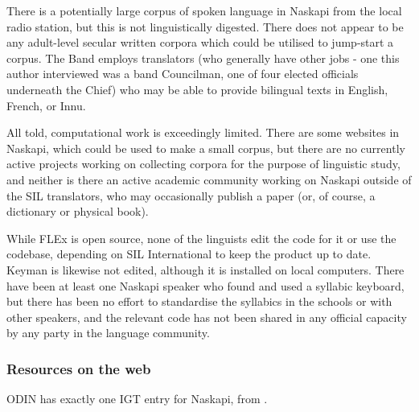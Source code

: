 There is a potentially large corpus of spoken language in Naskapi from the local radio station, but this is not linguistically digested. There does not appear to be any adult-level secular written corpora which could be utilised to jump-start a corpus. The Band employs translators (who generally have other jobs - one this author interviewed was a band Councilman, one of four elected officials underneath the Chief) who may be able to provide bilingual texts in English, French, or Innu.

All told, computational work is exceedingly limited. There are some websites in Naskapi, which could be used to make a small corpus, but there are no currently active projects working on collecting corpora for the purpose of linguistic study, and neither is there an active academic community working on Naskapi outside of the SIL translators, who may occasionally publish a paper (or, of course, a dictionary or physical book).

While FLEx is open source, none of the linguists edit the code for it or use the codebase, depending on SIL International to keep the product up to date. Keyman is likewise not edited, although it is installed on local computers. There have been at least one Naskapi speaker who found and used a syllabic keyboard, but there has been no effort to standardise the syllabics in the schools or with other speakers, and the relevant code has not been shared in any official capacity by any party in the language community.

\subsubsection{Resources on the web}

ODIN has exactly one IGT entry for Naskapi, from \citep{richards2004syntax}.

